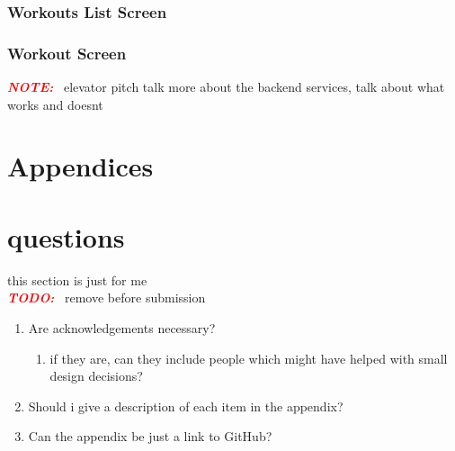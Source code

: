 \documentclass{article}
\newcommand{\vspaceconst}{-2ex}
\newcommand{\TODO}{\textbf{\textit{\textcolor{red}{TODO:}}} }
\newcommand{\NOTE}{\textbf{\textit{\textcolor{red}{NOTE:}}} }
\begin{document}
\begin{multicols}{2}
\subsubsection{Workouts List Screen}
\vspace{\vspaceconst}

\subsubsection{Workout Screen}
\vspace{\vspaceconst}

\NOTE~elevator pitch talk more about the backend services, talk about what works and doesnt



\newpage
\section*{Appendices}
\vspace{\vspaceconst}

\begin{enumerate}

\end{enumerate}


\section{questions} 
this section is just for me\\
\TODO~remove before submission\\
\begin{enumerate}
  \item Are acknowledgements necessary?
  \begin{enumerate}
    \item if they are, can they include people which might have helped with small design decisions?
  \end{enumerate}
  \item Should i give a description of each item in the appendix?
  \item Can the appendix be just a link to GitHub?
\end{enumerate}


\end{multicols}
\end{document}
